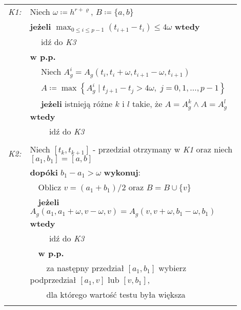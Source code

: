 \documentclass[oik, pdftex, robocza, man]{mgrwms}
\begin{document}
    \vspace{10pt}
    \noindent
    \begin{tabular}{p{0.045\linewidth} p{0.85\linewidth}}
        \textit{K1:}    & Niech $\omega \coloneqq h^{r+\varrho}$, $B \coloneqq \{a, b\}$ \\
                        & \textbf{jeżeli} \(\displaystyle \max_{0 \leq i \leq p-1} (t_{i+1} - t_{i}) \leq 4\omega \) \textbf{wtedy} \\
                        & $\quad$ idź do \textit{K3} \\
                        & \textbf{w p.p.} \\
                        & $\quad$ Niech $A_{g}^{i} = A_{g}\left(t_{i}, t_{i}+\omega, t_{i+1}-\omega, t_{i+1}\right)$ \\
                        & $\quad$ $A\coloneqq\max \left\{A_{g}^{i} \mid t_{j+1}-t_{j}>4 \omega,\; j=0,1, \ldots, p-1 \right\}$ \\
                        & $\quad$ \textbf{jeżeli} istnieją różne $k$ i $l$ takie, że $A = A_{g}^{k} \land A = A_{g}^{l}$ \textbf{wtedy} \\
                        & $\quad\quad$ idź do \textit{K3} \\
                        & \\

        \textit{K2:}    & Niech $[t_{k}, t_{k+1}]$ - przedział otrzymany w \textit{K1} oraz niech $[a_{1}, b_{1}] = [a, b]$ \\
                        & \textbf{dopóki} $b_{1} - a_{1} > \omega$ \textbf{wykonuj}: \\
                        & $\quad$Oblicz $v = (a_{1} + b_{1}) / 2$ oraz $B = B \cup \{v\}$ \\
                        & $\quad$\textbf{jeżeli} $A_{g}(a_{1}, a_{1} + \omega, v - \omega, v) = A_{g}(v, v + \omega, b_{1} - \omega, b_{1})$ \textbf{wtedy} \\
                        & $\quad$$\quad$ idź do \textit{K3} \\
                        & $\quad$\textbf{w p.p.} \\
                        & $\quad$$\quad$za następny przedział $[a_{1}, b_{1}]$ wybierz podprzedział $[a_{1}, v]$ lub $[v, b_{1}]$, \\
                        & $\quad$$\quad$dla którego wartość testu była większa \\
                        &  \\


\end{tabular}
\end{document}
